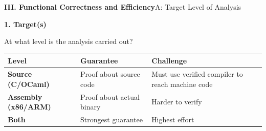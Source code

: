 \documentclass[10pt,aspectratio=1610,compress,dvipsnames]{beamer}
\begin{document}
\begin{frame}[fragile]{\bfseries III. Functional Correctness and Efficiency}{A: Target Level of Analysis}
\begin{description}[style=nextline]
	\item[\textbf{Accuracy (A)}] \colorbox{-blue}{\textbf{1. Target(s)}}
	\item[$\to$] At what level is the analysis carried out?
\end{description}
\begin{center}
\renewcommand{\arraystretch}{1.4}
\begin{tabular}{l|l|p{6cm}}
\toprule[1.2pt]
\textbf{Level} & \textbf{Guarantee} & \textbf{Challenge} \\
\midrule
\textbf{Source (C/OCaml)} & Proof about source code & Must use verified compiler to reach machine code \\
\hline
\textbf{Assembly (x86/ARM)} & Proof about actual binary & Harder to verify \\
\hline
\textbf{Both} & Strongest guarantee & Highest effort \\
\bottomrule[1.2pt]
\end{tabular}
\end{center}
\vfill
\end{frame}
\end{document}
